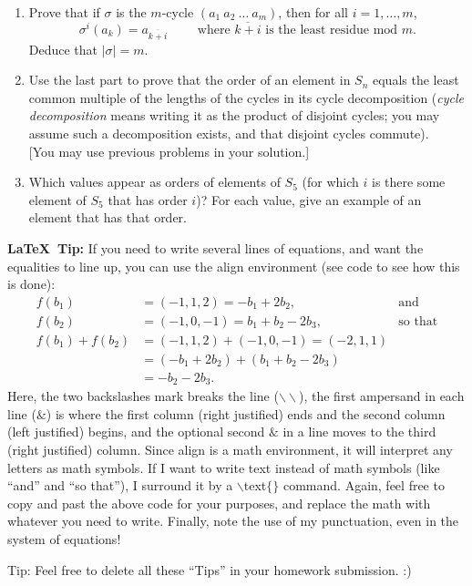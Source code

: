 \documentclass[11pt, reqno]{amsart}
\theoremstyle{plain}
\theoremstyle{definition}
\theoremstyle{example}
\newcommand{\NOTE}[1]{{\color{blue}#1}}
\begin{document}
\begin{enumerate}[1.]
\begin{enumerate}
	\item Prove that if $\sigma$ is the $m$-cycle $(a_1~a_2~\dots~a_m)$, then for all $i =1, \dots, m$, 
$$\sigma^i(a_k) = a_{\overline{k+{i}}} \qquad \text{ where $\overline{k+{i}}$ is the least residue mod $m$.}$$
Deduce that $|\sigma|=m$. 


	\item Use the last part to prove that the order of an element in $S_n$ equals the least common multiple of the lengths of the cycles in its cycle decomposition (\emph{cycle decomposition} means writing it as the product of disjoint cycles; you may assume such a decomposition exists, and that disjoint cycles commute).\\
	 {[You may use previous problems in your solution.]}

	\item Which values appear as orders of elements of $S_5$ (for which $i$ is there some element of $S_5$ that has order $i$)? For each value, give an example of an element that has that order. 
\end{enumerate}



\end{enumerate}
\NOTE{\textbf{\LaTeX\ Tip:} If you need to write several lines of equations, and want the equalities to line up, you can use the align environment (see code to see how this is done):
\begin{align*}
f(b_1) &= (-1, 1, 2) = -b_1 + 2b_2, & \text{and}\\
f(b_2) &= (-1, 0, -1) = b_1 + b_2 - 2b_3, & \text{so that}\\
f(b_1) + f(b_2)
	&= (-1, 1, 2) + (-1, 0, -1)  = (-2, 1, 1)\\
	&= (-b_1 + 2b_2) + (b_1 + b_2 - 2b_3)\\
	&= -b_2 - 2b_3.
\end{align*}
Here, the two backslashes mark breaks the line ($\backslash\backslash$), the first ampersand in each line ($\&$)  is where the first column (right justified) ends and the second column (left justified) begins, and the optional second $\&$ in a line moves to the third (right justified) column. Since align is a math environment, it will interpret any letters as math symbols. If I want to write text instead of math symbols (like ``and'' and ``so that''), I surround it by a $\backslash$text$\{\}$ command. Again, feel free to copy and past the above code for your purposes, and replace the math with whatever you need to write. Finally, note the use of my punctuation, even in the system of equations!
}

\smallskip

\NOTE{Tip: Feel free to delete all these ``Tips'' in your homework submission. :)}
\end{document}
